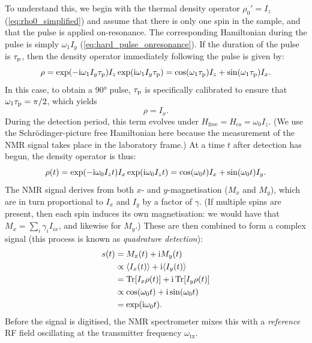 To understand this, we begin with the thermal density operator $\rho_0' = I_z$ (\cref{eq:rho0_simplified}) and assume that there is only one spin in the sample, and that the pulse is applied on-resonance.
The corresponding Hamiltonian during the pulse is simply $\omega_1 I_y$ (\cref{eq:hard_pulse_onresonance}).
If the duration of the pulse is $\tau_\mathrm{p}$, then the density operator immediately following the pulse is given by:
\begin{equation}
    \label{eq:rho_after_pulse}
    \rho = \exp(-\mathrm{i}\omega_1 I_y\tau_\mathrm{p}) I_z \exp(\mathrm{i}\omega_1 I_y\tau_\mathrm{p}) = \cos(\omega_1\tau_\mathrm{p})I_z + \sin(\omega_1\tau_\mathrm{p})I_x.
\end{equation}
In this case, to obtain a \ang{90} pulse, $\tau_\mathrm{p}$ is specifically calibrated to ensure that $\omega_1\tau_\mathrm{p} = \pi/2$, which yields
\begin{equation}
    \label{eq:rho_after_pulse_simplified}
    \rho = I_x.
\end{equation}
During the detection period, this term evolves under $H_\text{free} = H_\text{cs} = \omega_0 I_z$.
(We use the Schr\"odinger-picture free Hamiltonian here because the measurement of the NMR signal takes place in the laboratory frame.)
At a time $t$ after detection has begun, the density operator is thus:
\begin{equation}
    \label{eq:rho_during_detection}
    \rho(t) = \exp(-\mathrm{i} \omega_0 I_z t)I_x\exp(\mathrm{i}\omega_0 I_z t) = \cos(\omega_0 t)I_x + \sin(\omega_0 t)I_y.
\end{equation}
The NMR signal derives from both $x$- and $y$-magnetisation ($M_x$ and $M_y$), which are in turn proportional to $I_x$ and $I_y$ by a factor of $\gamma$.
(If multiple spins are present, then each spin induces its own magnetisation: we would have that $M_x = \sum_i \gamma_i I_{ix}$, and likewise for $M_y$.)
These are then combined to form a complex signal (this process is known as \textit{quadrature detection}):
\begin{align}
    s(t) &= M_x(t) + \mathrm{i} M_y(t) \label{eq:quadrature} \\
         &\propto \langle I_x(t) \rangle + \mathrm{i} \langle I_y(t) \rangle \notag \\
         &= \operatorname{Tr}[I_x\rho(t)] + \mathrm{i} \operatorname{Tr}[I_y\rho(t)] \notag \\
         &\propto \cos(\omega_0 t) + \mathrm{i} \sin(\omega_0 t) \notag \\
         &= \exp(\mathrm{i} \omega_0 t). \label{eq:fid}
\end{align}
Before the signal is digitised, the NMR spectrometer mixes this with a \textit{reference} RF field oscillating at the transmitter frequency $\omega_\text{tx}$.
